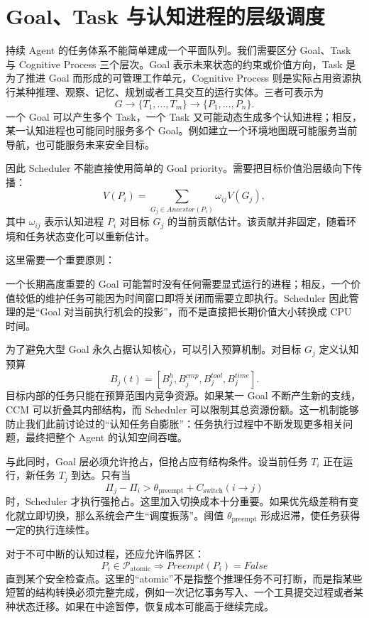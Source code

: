\section{Goal、Task 与认知进程的层级调度}

持续 Agent 的任务体系不能简单建成一个平面队列。我们需要区分 Goal、Task 与 Cognitive Process 三个层次。Goal 表示未来状态的约束或价值方向，Task 是为了推进 Goal 而形成的可管理工作单元，Cognitive Process 则是实际占用资源执行某种推理、观察、记忆、规划或者工具交互的运行实体。三者可表示为
\[
G
\rightarrow
\{T_1,\ldots,T_m\}
\rightarrow
\{P_1,\ldots,P_n\}.
\]
一个 Goal 可以产生多个 Task，一个 Task 又可能动态生成多个认知进程；相反，某一认知进程也可能同时服务多个 Goal。例如建立一个环境地图既可能服务当前导航，也可能服务未来安全目标。

因此 Scheduler 不能直接使用简单的 Goal priority。需要把目标价值沿层级向下传播：
\[
V(P_i)
=
\sum_{G_j\in Ancestor(P_i)}
\omega_{ij}V(G_j),
\]
其中 $\omega_{ij}$ 表示认知进程 $P_i$ 对目标 $G_j$ 的当前贡献估计。该贡献并非固定，随着环境和任务状态变化可以重新估计。

这里需要一个重要原则：
\begin{statementbox}
\centering
{}
\end{statementbox}
一个长期高度重要的 Goal 可能暂时没有任何需要显式运行的进程；相反，一个价值较低的维护任务可能因为时间窗口即将关闭而需要立即执行。Scheduler 因此管理的是“Goal 对当前执行机会的投影”，而不是直接把长期价值大小转换成 CPU 时间。

为了避免大型 Goal 永久占据认知核心，可以引入预算机制。对目标 $G_j$ 定义认知预算
\[
B_j(t)=
[
B_j^h,
B_j^{cmp},
B_j^{tool},
B_j^{time}
].
\]
目标内部的任务只能在预算范围内竞争资源。如果某一 Goal 不断产生新的支线，CCM 可以折叠其内部结构，而 Scheduler 可以限制其总资源份额。这一机制能够防止我们此前讨论过的“认知任务自膨胀”：任务执行过程中不断发现更多相关问题，最终把整个 Agent 的认知空间吞噬。

与此同时，Goal 层必须允许抢占，但抢占应有结构条件。设当前任务 $T_i$ 正在运行，新任务 $T_j$ 到达。只有当
\[
\Pi_j-\Pi_i
>
\theta_{\mathrm{preempt}}
+
C_{\mathrm{switch}}(i\rightarrow j)
\]
时，Scheduler 才执行强抢占。这里加入切换成本十分重要。如果优先级差稍有变化就立即切换，那么系统会产生“调度振荡”。阈值 $\theta_{\mathrm{preempt}}$ 形成迟滞，使任务获得一定的执行连续性。

对于不可中断的认知过程，还应允许临界区：
\[
P_i\in\mathcal P_{\mathrm{atomic}}
\Rightarrow
Preempt(P_i)=False
\]
直到某个安全检查点。这里的“atomic”不是指整个推理任务不可打断，而是指某些短暂的结构转换必须完整完成，例如一次记忆事务写入、一个工具提交过程或者某种状态迁移。如果在中途暂停，恢复成本可能高于继续完成。

